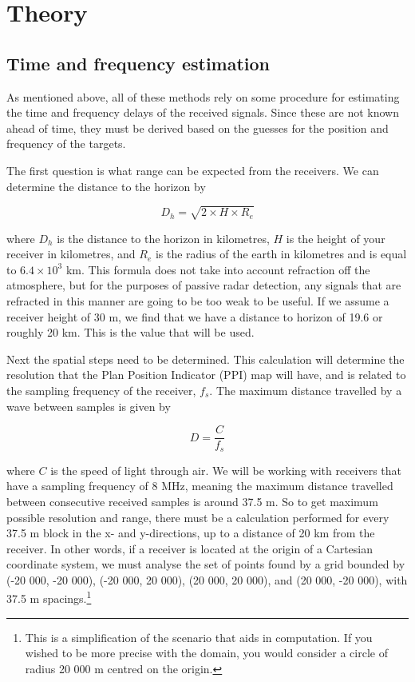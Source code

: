 \documentclass[12pt,openany,a4paper]{book}
\begin{document}
\section{Theory}

\subsection{Time and frequency estimation}
\label{sec:TFE}
As mentioned above, all of these methods rely on some procedure for estimating the time and frequency delays of the received signals. Since these are not known ahead of time, they must be derived based on the guesses for the position and frequency of the targets.

\bigskip

The first question is what range can be expected from the receivers. We can determine the distance to the horizon by \cite{RHB}

\begin{equation}
D_{h} = \sqrt{2 \times H \times R_{e}}
\end{equation}

\bigskip

where $D_{h}$ is the distance to the horizon in kilometres, $H$ is the height of your receiver in kilometres, and $R_{e}$ is the radius of the earth in kilometres and is equal to $6.4\times 10^{3}$ km. This formula does not take into account refraction off the atmosphere, but for the purposes of passive radar detection, any signals that are refracted in this manner are going to be too weak to be useful. If we assume a receiver height of 30 m, we find that we have a distance to horizon of 19.6 or roughly 20 km. This is the value that will be used.

\bigskip

Next the spatial steps need to be determined. This calculation will determine the resolution that the Plan Position Indicator (PPI) map will have, and is related to the sampling frequency of the receiver, $f_{s}$. The maximum distance travelled by a wave between samples is given by 

\begin{equation}
D = \frac{C}{f_{s}}
\end{equation}

\bigskip

where $C$ is the speed of light through air. We will be working with receivers that have a sampling frequency of 8 MHz, meaning the maximum distance travelled between consecutive received samples is around 37.5 m. So to get maximum possible resolution and range, there must be a calculation performed for every 37.5 m block in the x- and y-directions, up to a distance of 20 km from the receiver. In other words, if a receiver is located at the origin of a Cartesian coordinate system, we must analyse the set of points found by a grid bounded by (-20 000, -20 000), (-20 000, 20 000), (20 000, 20 000), and (20 000, -20 000), with 37.5 m spacings.\footnote{This is a simplification of the scenario that aids in computation. If you wished to be more precise with the domain, you would consider a circle of radius 20 000 m centred on the origin.} 
\end{document}
